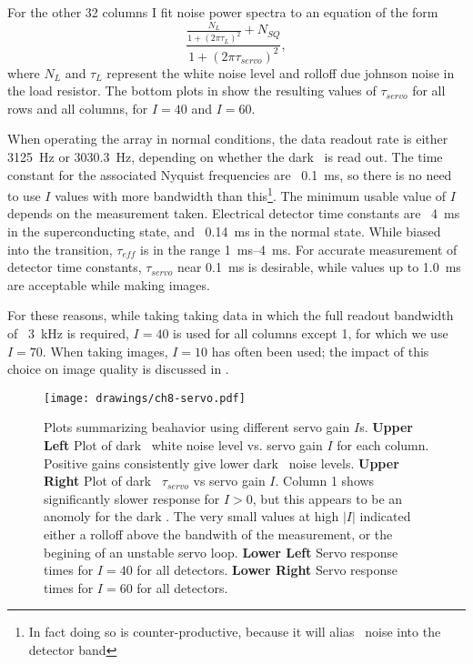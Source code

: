 For the other 32 columns I fit noise power spectra to an equation of the form
\begin{equation}
  \frac{\frac{N_{L}}{1+(2 \pi \tau_L)^2} + N_{SQ}}{1 + (2 \pi \tau_{servo})^2},
\end{equation}
where $N_L$ and $\tau_L$ represent the white noise level and rolloff due johnson noise in the load resistor.
The bottom plots in  show the resulting values of $\tau_{servo}$ for all rows and all columns, for $I = 40$ and $I = 60$.

When operating the array in normal conditions, the data readout rate is either \SI{3125}{Hz} or \SI{3030.3}{Hz}, depending on whether the dark \SQUID\ is read out.
The time constant for the associated Nyquist frequencies are \abt~\SI{0.1}{ms}, so there is no need to use $I$ values with more bandwidth than this\footnote{In fact doing so is counter-productive, because it will alias \SQUID\ noise into the detector band}.
The minimum usable value of $I$ depends on the measurement taken.
Electrical detector time constants are \abt~\SI{4}{ms} in the superconducting state, and \abt~\SI{0.14}{ms} in the normal state.
While biased into the transition, $\tau_{eff}$ is in the range \SIrange{1}{4}{ms}.
For accurate measurement of detector time constants, $\tau_{servo}$ near \SI{0.1}{ms} is desirable, while values up to \SI{1.0}{ms} are acceptable while making images.

For these reasons, while taking taking data in which the full readout bandwidth of \abt~\SI{3}{kHz} is required, $I = 40$ is used for all columns except 1, for which we use $I=70$.
When taking images, $I=10$ has often been used; the impact of this choice on image quality is discussed in .

\begin{figure*}
\texttt{[image: drawings/ch8-servo.pdf]}
\caption{Plots summarizing beahavior using different servo gain $I$s.
\textbf{Upper Left} Plot of dark \SQUID\ white noise level vs. servo gain $I$ for each column. Positive gains consistently give lower dark \SQUID\ noise levels.
\textbf{Upper Right} Plot of dark \SQUID\ $\tau_{servo}$ vs servo gain $I$. Column 1 shows significantly slower response for $I > 0$, but this appears to be an anomoly for the dark \SQUID. The very small values at high $|I|$ indicated either a rolloff above the bandwith of the measurement, or the begining of an unstable servo loop.
\textbf{Lower Left} Servo response times for $I = 40$ for all detectors.
\textbf{Lower Right} Servo response times for $I = 60$ for all detectors.
}
\label{fig:ch8-servo}
\end{figure*}

